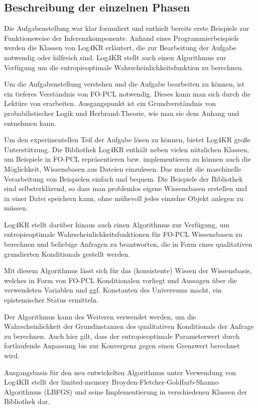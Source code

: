 \documentclass[draft]{scrreprt}
\begin{document}
\subsection{Beschreibung der einzelnen Phasen}
Die Aufgabenstellung war klar formuliert und enthielt bereits erste Beispiele zur Funktionsweise der Inferenzkomponente. Anhand eines Programmierbeispiels werden die Klassen von Log4KR erläutert, die zur Bearbeitung der Aufgabe notwendig oder hilfreich sind. Log4KR stellt auch einen Algorithmus zur Verfügung um die entropieoptimale Wahrscheinlichkeitsfunktion zu berechnen.

Um die Aufgabenstellung verstehen und die Aufgabe bearbeiten zu können, ist ein tieferes Verständnis von FO-PCL notwendig. Dieses kann man sich durch die Lektüre von \cite{Fis10} erarbeiten. Ausgangspunkt ist ein Grundverständnis von probabilistischer Logik und Herbrand-Theorie, wie man sie dem Anhang und \cite{BK15} entnehmen kann.


Um den experimentellen Teil der Aufgabe lösen zu können, bietet Log4KR große Unterstützung.
Die Bibliothek Log4KR enthält neben vielen nützlichen Klassen, um Beispiele in FO-PCL repräsentieren bzw. implementieren zu können auch die Möglichkeit, Wissensbasen aus Dateien einzulesen. Das macht die maschinelle Verarbeitung von Beispielen einfach und bequem. Die Beispiele der Bibliothek sind selbsterklärend, so dass man problemlos eigene Wissensbasen erstellen und in einer Datei speichern kann, ohne mühevoll jedes einzelne Objekt anlegen zu müssen.

Log4KR stellt darüber hinaus auch einen Algorithmus zur Verfügung, um entropieoptimale Wahrscheinlichkeitsfunktionen für FO-PCL Wissensbasen zu berechnen und beliebige Anfragen zu beantworten, die in Form eines qualitativen grundierten Konditionals gestellt werden. 

Mit diesem Algorithmus lässt sich für das (konsistente) Wissen der Wissensbasis, welches in Form von FO-PCL Konditionalen vorliegt und Aussagen über die verwendeten Variablen und ggf. Konstanten des Universums macht, ein epistemischer Status ermitteln.

Der Algorithmus kann des Weiteren verwendet werden, um die Wahrscheinlichkeit der Grundinstanzen des qualitativen Konditionals der Anfrage zu berechnen. Auch hier gilt, dass der entropieoptimale Parameterwert durch fortlaufende Anpassung bis zur Konvergenz gegen einen Grenzwert berechnet wird. 

Ausgangsbasis für den neu entwickelten Algorithmus unter Verwendung von Log4KR stellt der limited-memory Broyden-Fletcher-Goldfarb-Shanno Algorithmus (LBFGS) und seine Implementierung in verschiedenen Klassen der Bibliothek dar. 
\end{document}
